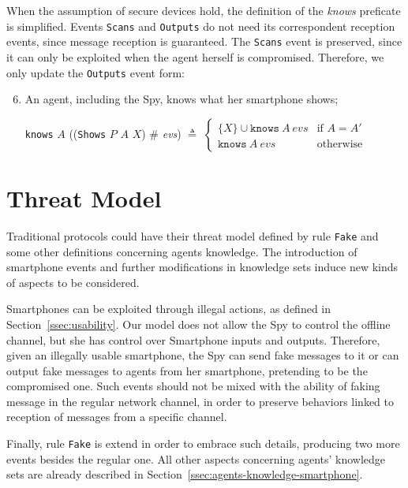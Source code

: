 When the assumption of secure devices hold, the definition of the \textit{knows} preficate is simplified. Events \texttt{Scans} and \texttt{Outputs} do not need its correspondent reception events, since message reception is guaranteed. The \texttt{Scans} event is preserved, since it can only be exploited when the agent herself is compromised. Therefore, we only update the  \texttt{Outputs} event form:
% 
\begin{enumerate}
  \setcounter{enumi}{5}
  \item An agent, including the Spy, knows what her smartphone shows;
  \begin{center}
    \texttt{knows} $A$ ((\texttt{Shows} $P$ $A$ $X$) $\#$ \textit{evs}) $\triangleq$ $\begin{cases}
      \{ X\} \cup \texttt{knows}\ A\ evs & \text{if } A = A'\\
      \texttt{knows}\ A\ evs & \text{otherwise}
    \end{cases}$
  \end{center}
\end{enumerate}



\section{Threat Model}
Traditional protocols could have their threat model defined by rule \texttt{Fake} and some other definitions concerning agents knowledge. The introduction of smartphone events and further modifications in knowledge sets induce new kinds of aspects to be considered.

Smartphones can be exploited through illegal actions, as defined in Section~\ref{ssec:usability}. Our model does not allow the Spy to control the offline channel, but she has control over Smartphone inputs and outputs. Therefore, given an illegally usable smartphone, the Spy can send fake messages to it or can output fake messages to agents from her smartphone, pretending to be the compromised one. Such events should not be mixed with the ability of faking message in the regular network channel, in order to preserve behaviors linked to reception of messages from a specific channel.

Finally, rule \texttt{Fake} is extend in order to embrace such details, producing two more events besides the regular one. All other aspects concerning agents' knowledge sets are already described in Section~\ref{ssec:agents-knowledge-smartphone}.


